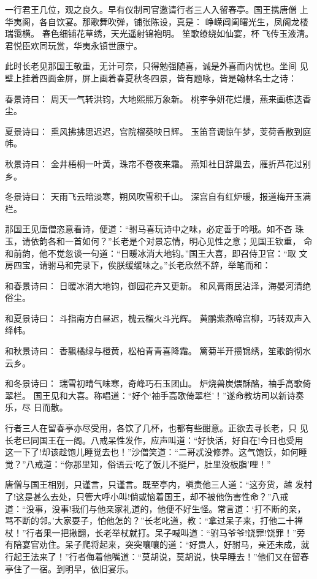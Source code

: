 一行君王几位，观之良久。早有仪制司官邀请行者三人入留春亭。国王携唐僧
上华夷阁，各自饮宴。那歌舞吹弹，铺张陈设，真是：
峥嵘阊阖曙光生，凤阁龙楼瑞霭横。
春色细铺花草绣，天光遥射锦袍明。
笙歌缭绕如仙宴，杯飞传玉液清。
君悦臣欢同玩赏，华夷永镇世康宁。

此时长老见那国王敬重，无计可奈，只得勉强随喜，诚是外喜而内忧也。坐间
见壁上挂着四面金屏，屏上画着春夏秋冬四景，皆有题咏，皆是翰林名士之诗：

春景诗曰：
周天一气转洪钧，大地熙熙万象新。
桃李争妍花烂熳，燕来画栋迭香尘。

夏景诗曰：
熏风拂拂思迟迟，宫院榴葵映日辉。
玉笛音调惊午梦，芰荷香散到庭帏。

秋景诗曰：
金井梧桐一叶黄，珠帘不卷夜来霜。
燕知社日辞巢去，雁折芦花过别乡。

冬景诗曰：
天雨飞云暗淡寒，朔风吹雪积千山。
深宫自有红炉暖，报道梅开玉满栏。

那国王见唐僧恣意看诗，便道：“驸马喜玩诗中之味，必定善于吟哦。如不吝
珠玉，请依韵各和一首如何？”长老是个对景忘情，明心见性之意；见国王钦重，
命和前韵，他不觉忽谈一句道：“日暖冰消大地钧。”国王大喜，即召侍卫官：“取
文房四宝，请驸马和完录下，俟朕缓缓味之。”长老欣然不辞，举笔而和：

和春景诗曰：
日暖冰消大地钧，御园花卉又更新。
和风膏雨民沾泽，海晏河清绝俗尘。

和夏景诗曰：
斗指南方白昼迟，槐云榴火斗光辉。
黄鹂紫燕啼宫柳，巧转双声入绛帏。

和秋景诗曰：
香飘橘绿与橙黄，松柏青青喜降霜。
篱菊半开攒锦绣，笙歌韵彻水云乡。

和冬景诗曰：
瑞雪初晴气味寒，奇峰巧石玉团山。
炉烧兽炭煨酥酪，袖手高歌倚翠栏。
国王见和大喜。称唱道：“好个‘袖手高歌倚翠栏’！”遂命教坊司以新诗奏乐，尽
日而散。

行者三人在留春亭亦尽受用，各饮了几杯，也都有些酣意。正欲去寻长老，只
见长老已同国王在一阁。八戒呆性发作，应声叫道：“好快活，好自在!今日也受用
这一下了!却该趁饱儿睡觉去也！”沙僧笑道：“二哥忒没修养。这气饱饫，如何睡
觉？”八戒道：“你那里知，俗语云‘吃了饭儿不挺尸，肚里没板脂’哩！”

唐僧与国王相别，只谨言，只谨言。既至亭内，嗔责他三人道：“这夯货，越
发村了!这是甚么去处，只管大呼小叫!倘或恼着国王，却不被他伤害性命？”八戒
道：“没事，没事!我们与他亲家礼道的，他便不好生怪。常言道：‘打不断的亲，
骂不断的邻。’大家耍子，怕他怎的？”长老叱道，教：“拿过呆子来，打他二十禅
杖！”行者果一把揪翻，长老举杖就打。呆子喊叫道：“驸马爷爷!饶罪!饶罪！”旁
有陪宴官劝住。呆子爬将起来，突突嚷嚷的道：“好贵人，好驸马，亲还未成，就
行起王法来了！”行者侮着他嘴道：“莫胡说，莫胡说，快早睡去！”他们又在留春
亭住了一宿。到明早，依旧宴乐。

